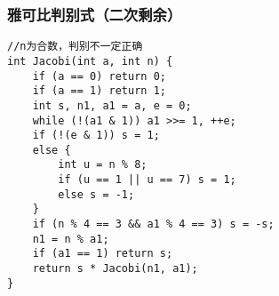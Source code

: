 \subsubsection{雅可比判别式（二次剩余）}
\begin{verbatim}
//n为合数，判别不一定正确
int Jacobi(int a, int n) {
    if (a == 0) return 0;
    if (a == 1) return 1;
    int s, n1, a1 = a, e = 0;
    while (!(a1 & 1)) a1 >>= 1, ++e;
    if (!(e & 1)) s = 1;
    else {
        int u = n % 8;
        if (u == 1 || u == 7) s = 1;
        else s = -1;
    }
    if (n % 4 == 3 && a1 % 4 == 3) s = -s;
    n1 = n % a1;
    if (a1 == 1) return s;
    return s * Jacobi(n1, a1);
}
\end{verbatim}
